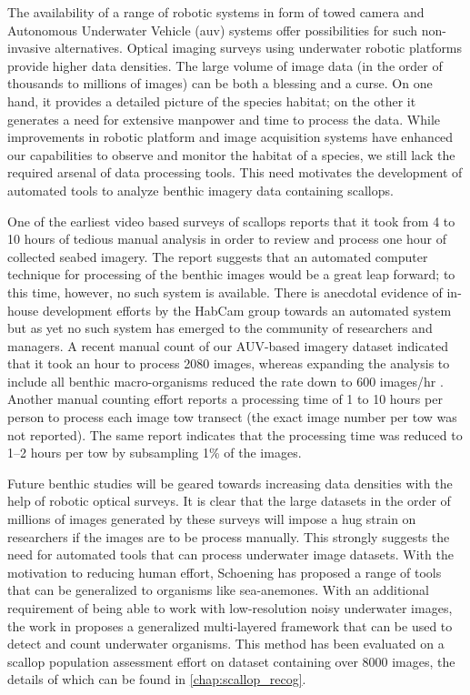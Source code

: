 \documentclass {udthesis}
\begin{document}
The availability of a range of robotic systems in form of towed camera and Autonomous Underwater Vehicle
(auv) systems offer possibilities for such non-invasive alternatives. Optical imaging surveys using underwater
robotic platforms provide higher data densities. The large volume of image data (in the order of thousands
to millions of images) can be both a blessing and a curse. On one hand, it provides a detailed picture of
the species habitat; on the other it generates a need for extensive manpower and time to process the data.
While improvements in robotic platform and image acquisition systems have enhanced our capabilities to
observe and monitor the habitat of a species, we still lack the required arsenal of data processing tools. This
need motivates the development of automated tools to analyze benthic imagery data containing scallops.

One of the earliest video based surveys of scallops \cite{rosenkratz} reports that
it took from 4 to 10 hours of tedious manual analysis in order to review and process one hour
of collected seabed imagery. The report suggests that an automated computer technique for
processing of the benthic images would be a great leap forward; to this time, however, no
such system is available. There is anecdotal evidence of in-house development efforts by the
HabCam group \cite{gallager} towards an automated system but as yet no such
system has emerged to the community of researchers and managers. A recent manual count
of our AUV-based imagery dataset indicated that it took an hour to process 2080 images,
whereas expanding the analysis to include all benthic macro-organisms reduced the rate
down to 600 images/hr \cite{walker}. Another manual counting effort \cite{oremland} 
reports a processing time of 1 to 10 hours per person to process each image tow
transect (the exact image number per tow was not reported). The same report indicates that
the processing time was reduced to 1–2 hours per tow by subsampling 1\% of the images.

Future benthic studies will be geared towards increasing data densities with the help of robotic optical surveys.
It is clear that the large datasets in the order of millions of images generated by these surveys will impose 
a hug strain on researchers if the images are to be process manually. This strongly suggests the need for automated tools
that can process underwater image datasets. With the motivation to reducing human effort, Schoening \cite{schoening} has proposed a range of tools that
can be generalized to organisms like sea-anemones. With an additional requirement of being able to work with low-resolution noisy underwater images, 
the work in \cite{prasanna_med, prasanna_aslo, prasanna_igi} proposes a generalized multi-layered framework that can be used to detect and count underwater organisms. This method has been evaluated on a scallop population assessment effort on dataset containing over 8000 images, the details of which can be found in \ref{chap:scallop_recog}.


\printglossary[type=\acronymtype]                  
\end{document}
